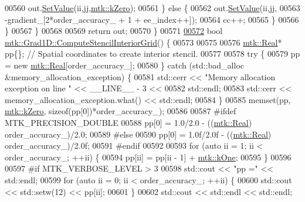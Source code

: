 \begin{DoxyCode}
{{00560         out.\hyperlink{classmtk_1_1DenseMatrix_a784ce5784109ac86bfb9d8562b334b13}{SetValue}(ii,jj,\hyperlink{group__c01-roots_ga59a451a5fae30d59649bcda274fea271}{mtk::kZero});
00561       \} \textcolor{keywordflow}{else} \{
00562         out.\hyperlink{classmtk_1_1DenseMatrix_a784ce5784109ac86bfb9d8562b334b13}{SetValue}(ii,jj,
00563                      -gradient\_[2*order\_accuracy\_ + 1 + ee\_index++]);
00564         cc++;
00565       \}
00566      \}
00567   \}
00568 
00569   \textcolor{keywordflow}{return} out;
00570 \}
00571 
\hypertarget{mtk__grad__1d_8cc_source_l00572}{}\hyperlink{classmtk_1_1Grad1D_ad6df25cc9dfc85ff8562ae3605486976}{00572} \textcolor{keywordtype}{bool} \hyperlink{classmtk_1_1Grad1D_ad6df25cc9dfc85ff8562ae3605486976}{mtk::Grad1D::ComputeStencilInteriorGrid}() \{
00573 
00575 
00576   \hyperlink{group__c01-roots_gac080bbbf5cbb5502c9f00405f894857d}{mtk::Real}* pp\{\}; \textcolor{comment}{// Spatial coordinates to create interior stencil.}
00577 
00578   \textcolor{keywordflow}{try} \{
00579     pp = \textcolor{keyword}{new} \hyperlink{group__c01-roots_gac080bbbf5cbb5502c9f00405f894857d}{mtk::Real}[order\_accuracy\_];
00580   \} \textcolor{keywordflow}{catch} (std::bad\_alloc &memory\_allocation\_exception) \{
00581     std::cerr << \textcolor{stringliteral}{"Memory allocation exception on line "} << \_\_LINE\_\_ - 3 <<
00582       std::endl;
00583     std::cerr << memory\_allocation\_exception.what() << std::endl;
00584   \}
00585   memset(pp, \hyperlink{group__c01-roots_ga59a451a5fae30d59649bcda274fea271}{mtk::kZero}, \textcolor{keyword}{sizeof}(pp[0])*order\_accuracy\_);
00586 
00587 \textcolor{preprocessor}{  #ifdef MTK\_PRECISION\_DOUBLE}
00588   pp[0] = 1.0/2.0 - ((\hyperlink{group__c01-roots_gac080bbbf5cbb5502c9f00405f894857d}{mtk::Real}) order\_accuracy\_)/2.0;
00589 \textcolor{preprocessor}{  #else}
00590   pp[0] = 1.0f/2.0f - ((\hyperlink{group__c01-roots_gac080bbbf5cbb5502c9f00405f894857d}{mtk::Real}) order\_accuracy\_)/2.0f;
00591 \textcolor{preprocessor}{  #endif}
00592 
00593   \textcolor{keywordflow}{for} (\textcolor{keyword}{auto} ii = 1; ii < order\_accuracy\_; ++ii) \{
00594     pp[ii] = pp[ii - 1] + \hyperlink{group__c01-roots_ga26407c24d43b6b95480943340d285c71}{mtk::kOne};
00595   \}
00596 
00597 \textcolor{preprocessor}{  #if MTK\_VERBOSE\_LEVEL > 3}
00598   std::cout << \textcolor{stringliteral}{"pp ="} << std::endl;
00599   \textcolor{keywordflow}{for} (\textcolor{keyword}{auto} ii = 0; ii < order\_accuracy\_; ++ii) \{
00600     std::cout << std::setw(12) << pp[ii];
00601   \}
00602   std::cout << std::endl << std::endl;
}}
\end{DoxyCode}
